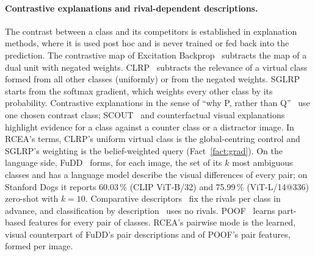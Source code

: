\documentclass[11pt,a4paper]{article}
\theoremstyle{plain}
\begin{document}
\paragraph{Contrastive explanations and rival-dependent descriptions.}
The contrast between a class and its competitors is established in explanation methods, where it is used post hoc
and is never trained or fed back into the prediction. The contrastive map of Excitation
Backprop~\citep{zhang2016excitation,zhang2018excitationijcv} subtracts the map of a dual unit with negated weights.
CLRP~\citep{gu2018clrp} subtracts the relevance of a virtual class formed from all other classes (uniformly) or from
the negated weights. SGLRP~\citep{iwana2019sglrp} starts from the softmax gradient, which weights every other class by
its probability. Contrastive explanations in the sense of ``why P, rather than Q''~\citep{prabhushankar2020contrastive}
use one chosen contrast class; SCOUT~\citep{wang2020scout} and counterfactual visual
explanations~\citep{goyal2019counterfactual} highlight evidence for a class against a counter class or a distractor
image. In RCEA's terms, CLRP's uniform virtual class is the global-centring control and SGLRP's weighting is the
belief-weighted query (Fact~\ref{fact:grad}). On the language side, FuDD~\citep{esfandiarpoor2024fudd} forms, for
each image, the set of its $k$ most ambiguous classes and has a language model describe the visual differences of
every pair; on Stanford Dogs it reports 60.03\,\% (CLIP ViT-B/32) and 75.99\,\% (ViT-L/14@336) zero-shot with
$k=10$. Comparative descriptors~\citep{lee2025comparative} fix the rivals per class in advance, and classification
by description~\citep{menon2023description} uses no rivals. POOF~\citep{berg2013poof} learns part-based features for
every pair of classes. RCEA's pairwise mode is the learned, visual counterpart of FuDD's pair descriptions and of
POOF's pair features, formed per image.
\end{document}
